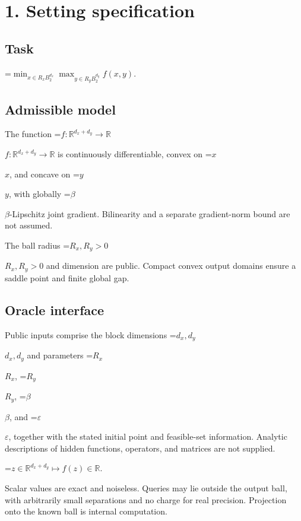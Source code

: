 \documentclass[10pt,a4paper]{article}
\newcommand{\AtlasMath}[1]{\par\begingroup\centering\setbox0=\hbox{$\displaystyle #1$}\ifdim\wd0>1.4\linewidth\typeout{ATLAS WIDE FORMULA: \the\wd0}\fi\ifdim\wd0>\linewidth\resizebox{\linewidth}{!}{\box0}\else\box0\fi\par\endgroup}
\newcommand{\AtlasInlineMath}[1]{\begingroup\setbox0=\hbox{$#1$}\ifdim\wd0>.4\linewidth\endgroup\AtlasMath{#1}\else\endgroup$#1$\fi}
\begin{document}
\section{1. Setting specification}


\subsection{Task}



\AtlasMath{\min_{x\in R_xB_2^{d_x}}\max_{y\in R_yB_2^{d_y}}f(x,y).}




\subsection{Admissible model}


The function \AtlasInlineMath{f:\mathbb{R}^{d_x+d_y}\to\mathbb{R}} is continuously differentiable, convex on \AtlasInlineMath{x}, and concave on \AtlasInlineMath{y}, with globally \AtlasInlineMath{\beta}-Lipschitz joint gradient. Bilinearity and a separate gradient-norm bound are not assumed.



The ball radius \AtlasInlineMath{R_x,R_y>0} and dimension are public. Compact convex output domains ensure a saddle point and finite global gap.



\subsection{Oracle interface}


Public inputs comprise the block dimensions \AtlasInlineMath{d_x,d_y} and parameters \AtlasInlineMath{R_x}, \AtlasInlineMath{R_y}, \AtlasInlineMath{\beta}, and \AtlasInlineMath{\varepsilon}, together with the stated initial point and feasible-set information. Analytic descriptions of hidden functions, operators, and matrices are not supplied.




\AtlasMath{z\in\mathbb{R}^{d_x+d_y}\longmapsto f(z)\in\mathbb{R}.}




Scalar values are exact and noiseless. Queries may lie outside the output ball, with arbitrarily small separations and no charge for real precision. Projection onto the known ball is internal computation.
\end{document}
